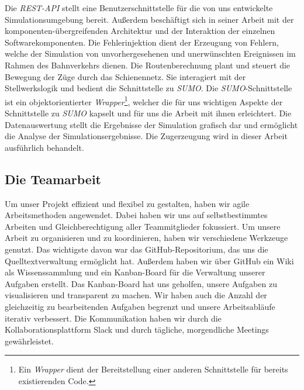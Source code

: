 Die \emph{REST-API} stellt eine Benutzerschnittstelle für die von uns entwickelte Simulationsumgebung bereit. Außerdem beschäftigt sich \citeauthor{kamp_architektur_2023} in seiner Arbeit mit der komponenten-übergreifenden Architektur und der Interaktion der einzelnen Softwarekomponenten. Die Fehlerinjektion dient der Erzeugung von Fehlern, welche der Simulation von unvorhergesehenen und unerwünschten Ereignissen im Rahmen des Bahnverkehrs dienen. Die Routenberechnung plant und steuert die Bewegung der Züge durch das Schienennetz. Sie interagiert mit der Stellwerkslogik und bedient die Schnittstelle zu \emph{SUMO}. Die \emph{SUMO}-Schnittstelle ist ein objektorientierter \emph{Wrapper}\footnote{Ein \emph{Wrapper} dient der Bereitstellung einer anderen Schnittstelle für bereits existierenden Code.}, welcher die für uns wichtigen Aspekte der Schnittstelle zu \emph{SUMO} kapselt und für uns die Arbeit mit ihnen erleichtert. Die Datenauswertung stellt die Ergebnisse der Simulation grafisch dar und ermöglicht die Analyse der Simulationsergebnisse. Die Zugerzeugung wird in dieser Arbeit ausführlich behandelt.

\subsection{Die Teamarbeit}

Um unser Projekt effizient und flexibel zu gestalten, haben wir agile Arbeitsmethoden angewendet. Dabei haben wir uns auf selbstbestimmtes Arbeiten und Gleichberechtigung aller Teammitglieder fokussiert. Um unsere Arbeit zu organisieren und zu koordinieren, haben wir verschiedene Werkzeuge genutzt. Das wichtigste davon war das GitHub-Repositorium, das uns die Quelltextverwaltung ermöglicht hat. Außerdem haben wir über GitHub ein Wiki als Wissenssammlung und ein Kanban-Board für die Verwaltung unserer Aufgaben erstellt. Das Kanban-Board hat uns geholfen, unsere Aufgaben zu visualisieren und transparent zu machen. Wir haben auch die Anzahl der gleichzeitig zu bearbeitenden Aufgaben begrenzt und unsere Arbeitsabläufe iterativ verbessert. Die Kommunikation haben wir durch die Kollaborationsplattform Slack und durch tägliche, morgendliche Meetings gewährleistet.